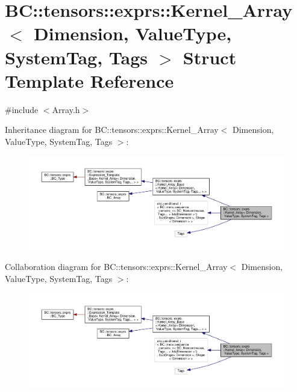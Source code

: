 \hypertarget{structBC_1_1tensors_1_1exprs_1_1Kernel__Array}{}\section{BC\+:\+:tensors\+:\+:exprs\+:\+:Kernel\+\_\+\+Array$<$ Dimension, Value\+Type, System\+Tag, Tags $>$ Struct Template Reference}
\label{structBC_1_1tensors_1_1exprs_1_1Kernel__Array}


{\ttfamily \#include $<$Array.\+h$>$}



Inheritance diagram for BC\+:\+:tensors\+:\+:exprs\+:\+:Kernel\+\_\+\+Array$<$ Dimension, Value\+Type, System\+Tag, Tags $>$\+:
\nopagebreak
\begin{figure}[H]
\begin{center}
\leavevmode
\includegraphics[width=350pt]{structBC_1_1tensors_1_1exprs_1_1Kernel__Array__inherit__graph}
\end{center}
\end{figure}


Collaboration diagram for BC\+:\+:tensors\+:\+:exprs\+:\+:Kernel\+\_\+\+Array$<$ Dimension, Value\+Type, System\+Tag, Tags $>$\+:
\nopagebreak
\begin{figure}[H]
\begin{center}
\leavevmode
\includegraphics[width=350pt]{structBC_1_1tensors_1_1exprs_1_1Kernel__Array__coll__graph}
\end{center}
\end{figure}
